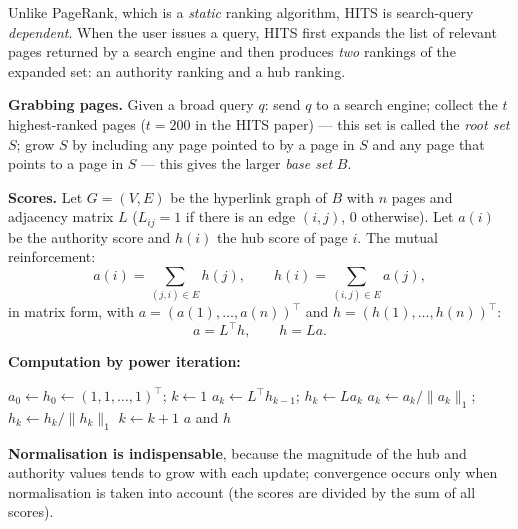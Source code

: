 \documentclass[11pt,a4paper]{article}
\theoremstyle{definition}
\begin{document}
\begin{defbox}
Unlike PageRank, which is a \emph{static} ranking algorithm, HITS is search-query \emph{dependent}.
When the user issues a query, HITS first expands the list of relevant pages returned by a search
engine and then produces \emph{two} rankings of the expanded set: an authority ranking and a hub
ranking.

\textbf{Grabbing pages.} Given a broad query $q$: send $q$ to a search engine; collect the $t$
highest-ranked pages ($t=200$ in the HITS paper) --- this set is called the \emph{root set} $S$; grow
$S$ by including any page pointed to by a page in $S$ and any page that points to a page in $S$ ---
this gives the larger \emph{base set} $B$.

\textbf{Scores.} Let $G=(V,E)$ be the hyperlink graph of $B$ with $n$ pages and adjacency matrix $L$
($L_{ij}=1$ if there is an edge $(i,j)$, 0 otherwise). Let $a(i)$ be the authority score and $h(i)$
the hub score of page $i$. The mutual reinforcement:
\[ a(i)=\sum_{(j,i)\in E}h(j),\qquad h(i)=\sum_{(i,j)\in E}a(j), \]
in matrix form, with $a=(a(1),\dots,a(n))^{\!\top}$ and $h=(h(1),\dots,h(n))^{\!\top}$:
\[ a=L^{\!\top}h,\qquad h=La. \]

\textbf{Computation by power iteration:}
\begin{algorithmic}[1]
\State $a_0\gets h_0\gets (1,1,\dots,1)^{\!\top}$; $k\gets 1$
\Repeat
  \State $a_k\gets L^{\!\top}h_{k-1}$; \quad $h_k\gets La_k$
  \State $a_k\gets a_k/\|a_k\|_1$; \quad $h_k\gets h_k/\|h_k\|_1$ 
  \State $k\gets k+1$
\State \Return $a$ and $h$
\end{algorithmic}
\textbf{Normalisation is indispensable}, because the magnitude of the hub and authority values tends
to grow with each update; convergence occurs only when normalisation is taken into account (the
scores are divided by the sum of all scores).
\end{defbox}
\end{document}

